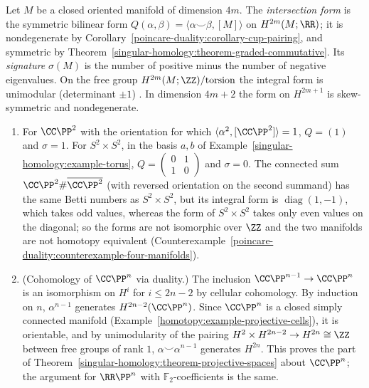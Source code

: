 \begin{definition}\label{poincare-duality:definition-intersection-form}
Let $M$ be a closed oriented manifold of dimension $4m$. The \emph{intersection form} is the symmetric bilinear form $Q(\alpha, \beta) = \langle \alpha \smile \beta, [M] \rangle$ on
$H^{2m}(M; \RR)$; it is nondegenerate by Corollary~\ref{poincare-duality:corollary-cup-pairing}, and symmetric by Theorem~\ref{singular-homology:theorem-graded-commutative}. Its
\emph{signature} $\sigma(M)$ is the number of positive minus the number of negative eigenvalues. On the free group $H^{2m}(M; \ZZ)/\mathrm{torsion}$ the integral form is
unimodular (determinant $\pm 1$) \cite[Proposition 3.38]{hatcher-at}. In dimension $4m + 2$ the form on $H^{2m+1}$ is skew-symmetric and nondegenerate.
\end{definition}

\begin{example}\label{poincare-duality:example-intersection-forms}
\begin{enumerate}
\item For $\CC\PP^2$ with the orientation for which $\langle \alpha^2, [\CC\PP^2]\rangle = 1$, $Q = (1)$ and $\sigma = 1$. For $S^2 \times S^2$, in the basis $a, b$ of
Example~\ref{singular-homology:example-torus}, $Q = \left(\begin{smallmatrix} 0 & 1 \\ 1 & 0 \end{smallmatrix}\right)$ and $\sigma = 0$. The connected sum
$\CC\PP^2 \# \overline{\CC\PP^2}$ (with reversed orientation on the second summand) has the same Betti numbers as $S^2 \times S^2$, but its integral form is
$\operatorname{diag}(1, -1)$, which takes odd values, whereas the form of $S^2 \times S^2$ takes only even values on the diagonal; so the forms are not isomorphic over $\ZZ$
and the two manifolds are not homotopy equivalent (Counterexample~\ref{poincare-duality:counterexample-four-manifolds}).
\item (Cohomology of $\CC\PP^n$ via duality.) The inclusion $\CC\PP^{n-1} \to \CC\PP^n$ is an isomorphism on $H^i$ for $i \leq 2n - 2$ by cellular cohomology. By induction on $n$,
$\alpha^{n-1}$ generates $H^{2n-2}(\CC\PP^n)$. Since $\CC\PP^n$ is a closed simply connected manifold (Example~\ref{homotopy:example-projective-cells}), it is orientable, and by unimodularity of the pairing
$H^2 \times H^{2n-2} \to H^{2n} \cong \ZZ$ between free groups of rank $1$, $\alpha \smile \alpha^{n-1}$ generates $H^{2n}$. This proves the part of
Theorem~\ref{singular-homology:theorem-projective-spaces} about $\CC\PP^n$; the argument for $\RR\PP^n$ with $\mathbb{F}_2$-coefficients is the same.
\end{enumerate}
\end{example}

